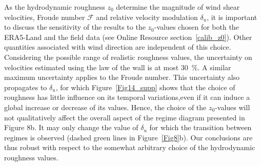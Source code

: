 As the hydrodynamic roughness $z_0$ determine the magnitude of wind shear velocities, Froude
number $\mathcal{F}$ and relative velocity modulation $\delta_{u}$, it is important to discuss
the sensitivity of the results to the $z_0$-values chosen for both the ERA5-Land and the field
data (see Online Resource section~\ref{calib_z0}). Other quantities associated with wind direction are
independent of this choice. Considering the possible range of realistic roughness values, the
uncertainty on velocities estimated using the law of the wall is at most 30~\%. A similar
maximum uncertainty applies to the Froude number. This uncertainty also propagates to
$\delta_{u}$, for which Figure~\ref{Fig14_supp} shows that the choice of roughness has little influence on
its temporal variations,even if it can induce a global increase or decrease of its values. Hence, the choice
of the $z_0$-values will not qualitatively affect the overall aspect of the regime diagram
presented in Figure 8b. It may only change the value of $\delta_u$ for which the transition
between regimes is observed (dashed green lines in Figure~\ref{Fig8}b). Our conclusions are thus robust
with respect to the somewhat arbitrary choice of the hydrodynamic roughness values.

